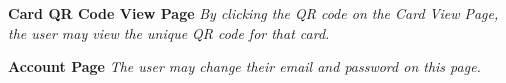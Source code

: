 \documentclass[12pt]{article}%
\begin{document}
\begin{center}
    \clearpage
    {\bf \Large Card QR Code View Page}
    {\it By clicking the QR code on the Card View Page, the user may view the unique QR code for that card.}
    
    \clearpage
    {\bf \Large Account Page}
    {\it The user may change their email and password on this page.}
    

\end{center}
\end{document}
